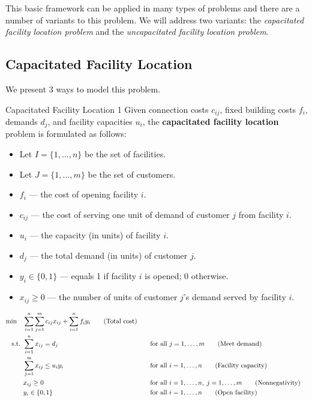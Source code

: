 This basic framework can be applied in many types of problems and there are a number of variants to this problem.   We will address two variants: the \emph{capacitated facility location problem} and the \emph{uncapacitated facility location problem}.  

\subsection{Capacitated Facility Location}
We present 3 ways to model this problem.

\begin{general}{Capacitated Facility Location 1}{\npcomplete}
Given connection costs \( c_{ij} \), fixed building costs \( f_i \), demands \( d_j \), and facility capacities \( u_i \), the \textbf{capacitated facility location} problem is formulated as follows:

\begin{itemize}
\item Let \( I = \{1,\dots, n\} \) be the set of facilities.
\item Let \( J = \{1, \dots, m\} \) be the set of customers.
\end{itemize}

\begin{itemize}
\item \( f_i \) — the cost of opening facility \( i \).
\item \( c_{ij} \) — the cost of serving one unit of demand of customer \( j \) from facility \( i \).
\item \( u_i \) — the capacity (in units) of facility \( i \).
\item \( d_j \) — the total demand (in units) of customer \( j \).
\end{itemize}

\begin{itemize}
\item \( y_i \in \{0,1\} \) — equals 1 if facility \( i \) is opened; 0 otherwise.
\item \( x_{ij} \geq 0 \) — the number of units of customer \( j \)'s demand served by facility \( i \).
\end{itemize}

\begin{align}
\min \quad & \sum_{i=1}^n \sum_{j=1}^m c_{ij} x_{ij} + \sum_{i=1}^n f_i y_i   \tag{Total cost} \\
\mbox{ s.t. }        & \sum_{i=1}^n x_{ij} = d_j &&\quad \mbox{for all } j = 1,\dots,m   \tag{Meet demand} \\
& \sum_{j=1}^m x_{ij} \leq u_i y_i &&\quad \mbox{for all } i = 1,\dots,n   \tag{Facility capacity} \\
& x_{ij} \geq 0 &&\quad \mbox{for all } i = 1,\dots,n,\; j = 1,\dots,m   \tag{Nonnegativity} \\
& y_i \in \{0,1\} &&\quad \mbox{for all } i = 1,\dots,n   \tag{Open facility}
\end{align}

\end{general}

